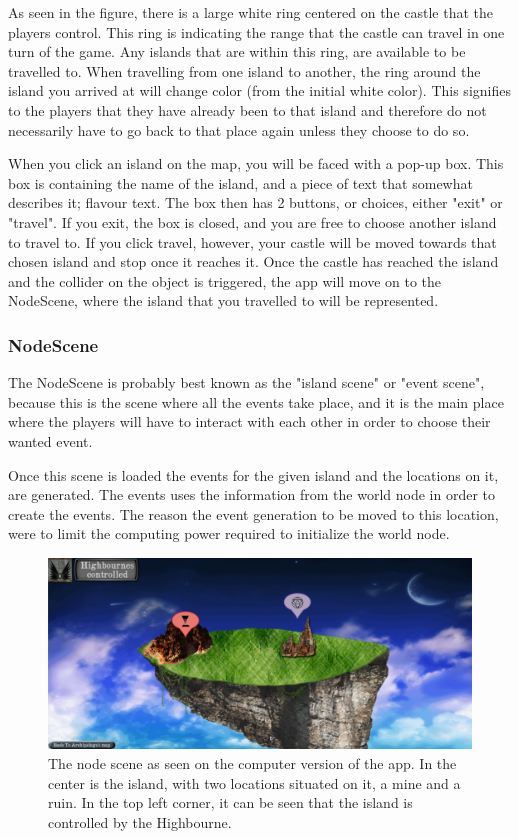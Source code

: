 As seen in the figure, there is a large white ring centered on the castle that the players control. This ring is indicating the range that the castle can travel in one turn of the game. Any islands that are within this ring, are available to be travelled to.
When travelling from one island to another, the ring around the island you arrived at will change color (from the initial white color). This signifies to the players that they have already been to that island and therefore do not necessarily have to go back to that place again unless they choose to do so.

When you click an island on the map, you will be faced with a pop-up box. This box is containing the name of the island, and a piece of text that somewhat describes it; flavour text. The box then has 2 buttons, or choices, either "exit" or "travel". If you exit, the box is closed, and you are free to choose another island to travel to. If you click travel, however, your castle will be moved towards that chosen island and stop once it reaches it. 
Once the castle has reached the island and the collider on the object is triggered, the app will move on to the NodeScene, where the island that you travelled to will be represented.

\subsubsection{NodeScene}
\label{sec:nodeScene}
The NodeScene is probably best known as the "island scene" or "event scene", because this is the scene where all the events take place, and it is the main place where the players will have to interact with each other in order to choose their wanted event.

Once this scene is loaded the events for the given island and the locations on it, are generated. The events uses the information from the world node in order to create the events. The reason the event generation to be moved to this location, were to limit the computing power required to initialize the world node. 

\begin{figure}[!ht]
    \centering
    \includegraphics[width=\textwidth]{Images/NodeScene.png}
    \caption{The node scene as seen on the computer version of the app. In the center is the island, with two locations situated on it, a mine and a ruin. In the top left corner, it can be seen that the island is controlled by the Highbourne.}
    \label{fig:nodescene}
\end{figure}

